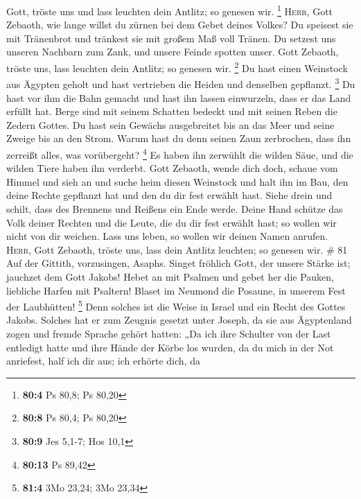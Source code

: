  Gott, tröste uns und lass leuchten dein Antlitz; so
genesen wir. \footnote{\textbf{80:4} Ps 80,8; Ps 80,20} 
\textsc{Herr}, Gott Zebaoth, wie lange willst du zürnen bei dem Gebet
deines Volkes?  Du speisest sie mit Tränenbrot und
tränkest sie mit großem Maß voll Tränen.  Du setzest uns
unseren Nachbarn zum Zank, und unsere Feinde spotten unser.
 Gott Zebaoth, tröste uns, lass leuchten dein Antlitz; so
genesen wir. \footnote{\textbf{80:8} Ps 80,4; Ps 80,20} 
Du hast einen Weinstock aus Ägypten geholt und hast vertrieben die
Heiden und denselben gepflanzt. \footnote{\textbf{80:9} Jes 5,1-7; Hos
  10,1}  Du hast vor ihm die Bahn gemacht und hast ihn
lassen einwurzeln, dass er das Land erfüllt hat.  Berge
sind mit seinem Schatten bedeckt und mit seinen Reben die Zedern Gottes.
 Du hast sein Gewächs ausgebreitet bis an das Meer und
seine Zweige bis an den Strom.  Warum hast du denn seinen
Zaun zerbrochen, dass ihn zerreißt alles, was vorübergeht? \footnote{\textbf{80:13}
  Ps 89,42}  Es haben ihn zerwühlt die wilden Säue, und
die wilden Tiere haben ihn verderbt.  Gott Zebaoth, wende
dich doch, schaue vom Himmel und sieh an und suche heim diesen Weinstock
 und halt ihn im Bau, den deine Rechte gepflanzt hat und
den du dir fest erwählt hast.  Siehe drein und schilt,
dass des Brennens und Reißens ein Ende werde.  Deine Hand
schütze das Volk deiner Rechten und die Leute, die du dir fest erwählt
hast;  so wollen wir nicht von dir weichen. Lass uns
leben, so wollen wir deinen Namen anrufen. 
\textsc{Herr}, Gott Zebaoth, tröste uns, lass dein Antlitz leuchten; so
genesen wir. \# 81  Auf der Gittith, vorzusingen, Asaphs.
 Singet fröhlich Gott, der unsere Stärke ist; jauchzet dem
Gott Jakobs!  Hebet an mit Psalmen und gebet her die
Pauken, liebliche Harfen mit Psaltern!  Blaset im Neumond
die Posaune, in unserem Fest der Laubhütten! \footnote{\textbf{81:4} 3Mo
  23,24; 3Mo 23,34}  Denn solches ist die Weise in Israel
und ein Recht des Gottes Jakobs.  Solches hat er zum
Zeugnis gesetzt unter Joseph, da sie aus Ägyptenland zogen und fremde
Sprache gehört hatten:  „Da ich ihre Schulter von der Last
entledigt hatte und ihre Hände der Körbe los wurden,  da
du mich in der Not anriefest, half ich dir aus; ich erhörte dich, da
